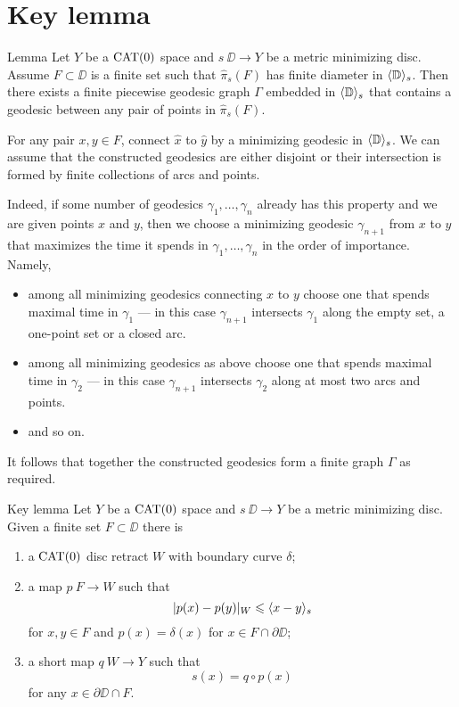 \section{Key lemma}\label{Key Lemma}


\begin{thm}{Lemma}\label{lem:graph}
Let $Y$ be a $\mathop{\rm CAT}\nolimits(0)$ space and $s\:\DD\to Y$ 
be a metric minimizing disc.
Assume $F\subset \DD$ is a finite set such that $\hat\pi_s(F)$ has finite
diameter in $\langle\mathbb{D}\rangle_s$.
Then there exists a finite piecewise geodesic graph $\Gamma$ embedded in $\langle\mathbb{D}\rangle_s$ that contains a geodesic between any pair of points in $\hat\pi_s(F)$.
\end{thm} 

For any pair $x,y\in F$, connect $\hat x$ to $\hat y$ by a minimizing geodesic in $\langle\mathbb{D}\rangle_s$. 
We can assume that the constructed geodesics 
are either disjoint or their intersection is formed by finite collections of arcs and points.

Indeed, if some number of geodesics $\gamma_1,\dots,\gamma_n$ already has this property and we are given points $x$ and $y$, then
we choose a minimizing geodesic $\gamma_{n+1}$ from $x$ to $y$ that maximizes the time it spends in $\gamma_1,\dots,\gamma_n$  
in the order of importance.
Namely, 
\begin{itemize}
\item  among all minimizing geodesics connecting $x$ to $y$
choose one that spends maximal time in $\gamma_1$ --- in this case $\gamma_{n+1}$ intersects $\gamma_1$ along the empty set, 
a one-point set or a closed arc.
\item among all minimizing geodesics as above
choose one that spends maximal time in $\gamma_2$ --- in this case $\gamma_{n+1}$ intersects $\gamma_2$ along at most two arcs and points.
\item and so on.
\end{itemize}

It follows that together the constructed geodesics form a finite graph $\Gamma$ as required.
\qeds



\begin{thm}{Key lemma}\label{lem:key}
Let $Y$ be a $\mathop{\rm CAT}\nolimits(0)$ space and $s\:\DD\to Y$ 
be a metric minimizing disc.
Given a finite set $F\subset \DD$
there is 
\begin{enumerate}[(1)]
	\item a $\mathop{\rm CAT}\nolimits(0)$ disc retract $W$ with boundary curve $\delta$;
	\item a map $p\:F\to W$ such that
\[|p(x)-p(y)|_W\leqslant \langle x-y\rangle_s\] 
for $x,y\in F$ and $p(x)=\delta(x)$ for $x\in F\cap \partial\DD$;
  \item a short map $q\:W\to Y$ such that
\[s(x)=q\circ p(x)\] 
for any $x\in\partial\DD\cap F$.
\end{enumerate}
 
\end{thm} 

